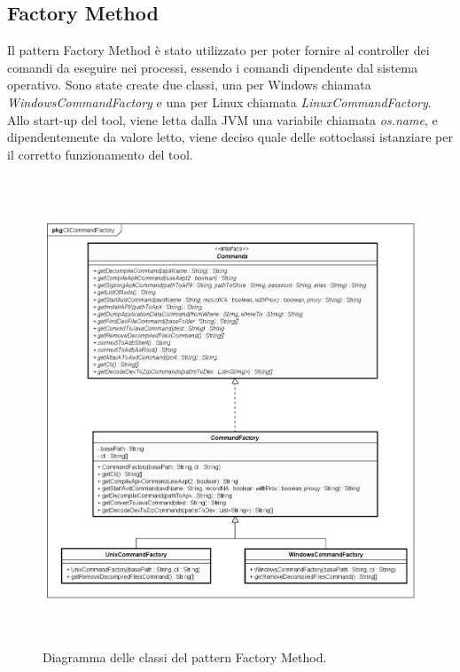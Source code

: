 \newpage
\subsection{Factory Method}\label{subsec:factory-method}
Il pattern Factory Method\cite{womak:factory-method} è stato utilizzato per poter fornire al controller dei comandi da eseguire nei processi, essendo i comandi dipendente dal sistema operativo. Sono state create due classi, una per Windows chiamata \textit{WindowsCommandFactory} e una per Linux chiamata \textit{LinuxCommandFactory}.
Allo start-up del tool, viene letta dalla JVM una variabile chiamata \textit{os.name}, e dipendentemente da valore letto, viene deciso quale delle sottoclassi istanziare per il corretto funzionamento del tool.
\begin{figure}[H]
    \centering
    \includegraphics[width=14cm, height=14cm]{./immagini/diagrammi_uml/CommandFactory.png}
    \caption{Diagramma delle classi del pattern Factory Method.}\label{fig:factory-method}
\end{figure}